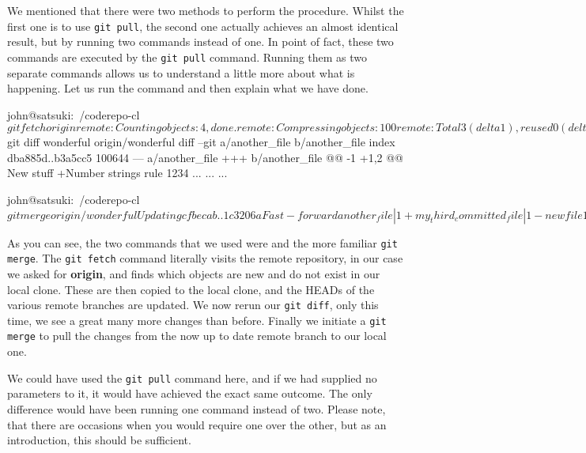 We mentioned that there were two methods to perform the procedure.
Whilst the first one is to use \texttt{git pull}, the second one actually achieves an almost identical result, but by running two commands instead of one.
In point of fact, these two commands are executed by the \texttt{git pull} command.
Running them as two separate commands allows us to understand a little more about what is happening.
Let us run the command and then explain what we have done.

\begin{code}
john@satsuki:~/coderepo-cl$ git fetch origin
remote: Counting objects: 4, done.
remote: Compressing objects: 100%
remote: Total 3 (delta 1), reused 0 (delta 0)
Unpacking objects: 100%
From /home/john/coderepo
   cfbecab..1c3206a  wonderful  -> origin/wonderful
john@satsuki:~/coderepo-cl$ git diff wonderful origin/wonderful
diff --git a/another_file b/another_file
index dba885d..b3a5cc5 100644
--- a/another_file
+++ b/another_file
@@ -1 +1,2 @@
 New stuff
+Number strings rule 1234
...
...
...

john@satsuki:~/coderepo-cl$ git merge origin/wonderful
Updating cfbecab..1c3206a
Fast-forward
 another_file            |    1 +
 my_third_committed_file |    1 -
 newfile1                |    3 ++-
 newfile2                |    2 +-
 newfile3                |    1 +
 5 files changed, 5 insertions(+), 3 deletions(-)
 delete mode 100644 my_third_committed_file
 create mode 100644 newfile3
john@satsuki:~/coderepo-cl$
\end{code}

As you can see, the two commands that we used were  and the more familiar \texttt{git merge}.
The \texttt{git fetch} command literally visits the remote repository, in our case we asked for \textbf{origin}, and finds which objects are new 
and do not exist in our local clone.
These are then copied to the local clone, and the HEADs of the various remote branches are updated.
We now rerun our \texttt{git diff}, only this time, we see a great many more changes than before.
Finally we initiate a \texttt{git merge} to pull the changes from the now up to date remote branch to our local one.

We could have used the \texttt{git pull} command here, and if we had supplied no parameters to it, it would have achieved the exact same outcome.
The only difference would have been running one command instead of two.
Please note, that there are occasions when you would require one over the other, but as an introduction, this should be sufficient.

